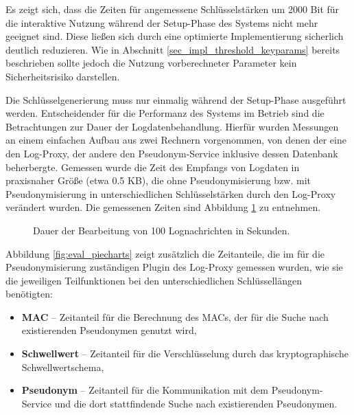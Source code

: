 Es zeigt sich, dass die Zeiten für angemessene Schlüsselstärken um 2000 Bit für die interaktive Nutzung während der Setup-Phase des Systems nicht mehr geeignet sind. Diese ließen sich durch eine optimierte Implementierung sicherlich deutlich reduzieren. Wie in Abschnitt \ref{sec_impl_threshold_keyparams} bereits beschrieben sollte jedoch die Nutzung vorberechneter Parameter kein Sicherheitsrisiko darstellen. 

Die Schlüsselgenerierung muss nur einmalig während der Setup-Phase ausgeführt werden. Entscheidender für die Performanz des Systems im Betrieb sind die Betrachtungen zur Dauer der Logdatenbehandlung. Hierfür wurden Messungen an einem einfachen Aufbau aus zwei Rechnern vorgenommen, von denen der eine den Log-Proxy, der andere den Pseudonym-Service inklusive dessen Datenbank beherbergte. Gemessen wurde die Zeit des Empfangs von Logdaten in praxisnaher Größe (etwa 0.5 KB), die ohne Pseudonymisierung bzw. mit Pseudonymisierung in unterschiedlichen Schlüsselstärken durch den Log-Proxy verändert wurden. Die gemessenen Zeiten sind Abbildung \ref{fig:eval_barchart} zu entnehmen.

\begin{figure}[]
    \centering
    \caption{Dauer der Bearbeitung von 100 Lognachrichten in Sekunden.}
    \label{fig:eval_barchart}
\end{figure}

Abbildung \ref{fig:eval_piecharts} zeigt zusätzlich die Zeitanteile, die im für die Pseudonymisierung zuständigen Plugin des Log-Proxy gemessen wurden, wie sie die jeweiligen Teilfunktionen bei den unterschiedlichen Schlüssellängen benötigten:
\begin{itemize}
  \item \textbf{MAC} -- Zeitanteil für die Berechnung des MACs, der für die Suche nach existierenden Pseudonymen genutzt wird, %
  \item \textbf{Schwellwert} -- Zeitanteil für die Verschlüsselung durch das kryptographische Schwellwertschema, %
  \item \textbf{Pseudonym} -- Zeitanteil für die Kommunikation mit dem Pseudonym-Service und die dort stattfindende Suche nach existierenden Pseudonymen.
\end{itemize} 

